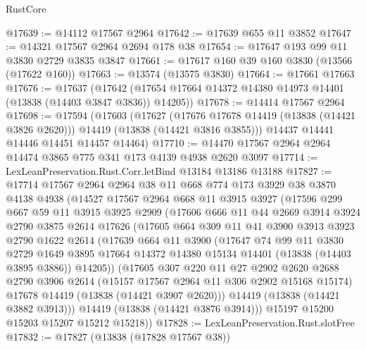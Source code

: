 \begin{lexlean}{RustCore}
\begin{coremodule}
@17639 := @14112 @17567 @2964
@17642 := @17639 @655 @11 @3852
@17647 := @14321 @17567 @2964 @2694 @178 @38
@17654 := @17647 @193 @99 @11 @3830 @2729 @3835 @3847
@17661 := @17617 @160 @39 @160 @3830 (@13566 (@17622 @160))
@17663 := @13574 (@13575 @3830)
@17664 := @17661 @17663
@17676 := @17637
    (@17642 (@17654 @17664 @14372 @14380 @14973 @14401 (@13838 (@14403 @3847 @3836)) @14205))
@17678 := @14414 @17567 @2964
@17698 := @17594
    (@17603
      (@17627
        (@17676 @17678 @14419 (@13838 (@14421 @3826 @2620)))
        @14419
        (@13838 (@14421 @3816 @3855)))
      @14437
      @14441
      @14446
      @14451
      @14457
      @14464)
@17710 := @14470 @17567 @2964 @2964 @14474 @3865 @775 @341 @173 @4139 @4938 @2620 @3097
@17714 := LexLeanPreservation.Rust.Corr.letBind @13184 @13186 @13188
@17827 := @17714
    @17567
    @2964
    @2964
    @38
    @11
    @668
    @774
    @173
    @3929
    @38
    @3870
    @4138
    @4938
    (@14527
      @17567
      @2964
      @668
      @11
      @3915
      @3927
      (@17596
        @299
        @667
        @59
        @11
        @3915
        @3925
        @2909
        (@17606
          @666
          @11
          @44
          @2669
          @3914
          @3924
          @2790
          @3875
          @2614
          @17626
          (@17605
            @664
            @309
            @11
            @41
            @3900
            @3913
            @3923
            @2790
            @1622
            @2614
            (@17639
              @664
              @11
              @3900
              (@17647
                @74
                @99
                @11
                @3830
                @2729
                @1649
                @3895
                @17664
                @14372
                @14380
                @15134
                @14401
                (@13838 (@14403 @3895 @3886))
                @14205))
            (@17605
              @307
              @220
              @11
              @27
              @2902
              @2620
              @2688
              @2790
              @3906
              @2614
              (@15157 @17567 @2964 @11 @306 @2902 @15168 @15174)
              @17678
              @14419
              (@13838 (@14421 @3907 @2620)))
            @14419
            (@13838 (@14421 @3882 @3913)))
          @14419
          (@13838 (@14421 @3876 @3914)))
        @15197
        @15200
        @15203
        @15207
        @15212
        @15218))
@17828 := LexLeanPreservation.Rust.slotFree
@17832 := @17827 (@13838 (@17828 @17567 @38))

\end{coremodule}
\end{lexlean}
